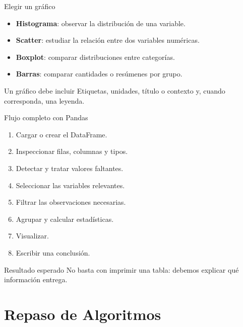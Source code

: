\documentclass[10pt]{beamer}
\begin{document}
\begin{frame}{Elegir un gráfico}
  \begin{itemize}
    \item \textbf{Histograma}: observar la distribución de una variable.
    \item \textbf{Scatter}: estudiar la relación entre dos variables numéricas.
    \item \textbf{Boxplot}: comparar distribuciones entre categorías.
    \item \textbf{Barras}: comparar cantidades o resúmenes por grupo.
  \end{itemize}

  \begin{alertblock}{Un gráfico debe incluir}
    Etiquetas, unidades, título o contexto y, cuando corresponda, una leyenda.
  \end{alertblock}
\end{frame}

\begin{frame}{Flujo completo con Pandas}
  \begin{enumerate}
    \item Cargar o crear el DataFrame.
    \item Inspeccionar filas, columnas y tipos.
    \item Detectar y tratar valores faltantes.
    \item Seleccionar las variables relevantes.
    \item Filtrar las observaciones necesarias.
    \item Agrupar y calcular estadísticas.
    \item Visualizar.
    \item Escribir una conclusión.
  \end{enumerate}

  \begin{block}{Resultado esperado}
    No basta con imprimir una tabla: debemos explicar qué información entrega.
  \end{block}
\end{frame}

\section{Repaso de Algoritmos}
\end{document}
